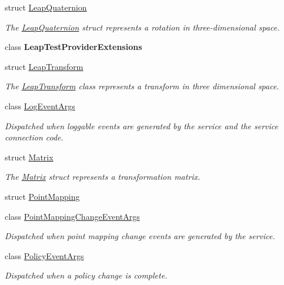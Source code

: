 \begin{DoxyCompactItemize}
struct \mbox{\hyperlink{struct_leap_1_1_leap_quaternion}{Leap\+Quaternion}}
\begin{DoxyCompactList}\small\item\em The \mbox{\hyperlink{struct_leap_1_1_leap_quaternion}{Leap\+Quaternion}} struct represents a rotation in three-\/dimensional space. \end{DoxyCompactList}\item 
class {\bfseries Leap\+Test\+Provider\+Extensions}
\item 
struct \mbox{\hyperlink{struct_leap_1_1_leap_transform}{Leap\+Transform}}
\begin{DoxyCompactList}\small\item\em The \mbox{\hyperlink{struct_leap_1_1_leap_transform}{Leap\+Transform}} class represents a transform in three dimensional space. \end{DoxyCompactList}\item 
class \mbox{\hyperlink{class_leap_1_1_log_event_args}{Log\+Event\+Args}}
\begin{DoxyCompactList}\small\item\em Dispatched when loggable events are generated by the service and the service connection code. \end{DoxyCompactList}\item 
struct \mbox{\hyperlink{struct_leap_1_1_matrix}{Matrix}}
\begin{DoxyCompactList}\small\item\em The \mbox{\hyperlink{struct_leap_1_1_matrix}{Matrix}} struct represents a transformation matrix. \end{DoxyCompactList}\item 
struct \mbox{\hyperlink{struct_leap_1_1_point_mapping}{Point\+Mapping}}
\item 
class \mbox{\hyperlink{class_leap_1_1_point_mapping_change_event_args}{Point\+Mapping\+Change\+Event\+Args}}
\begin{DoxyCompactList}\small\item\em Dispatched when point mapping change events are generated by the service. \end{DoxyCompactList}\item 
class \mbox{\hyperlink{class_leap_1_1_policy_event_args}{Policy\+Event\+Args}}
\begin{DoxyCompactList}\small\item\em Dispatched when a policy change is complete. \end{DoxyCompactList}\item 

\end{DoxyCompactItemize}

